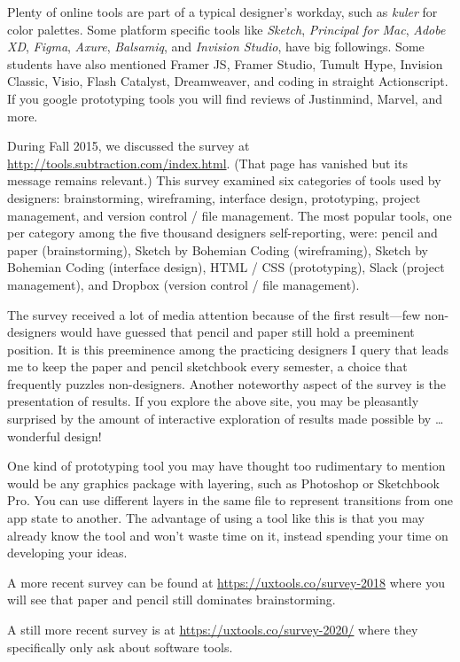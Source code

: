 Plenty of online tools are part of a typical designer's workday, such as
\emph{kuler} for color palettes. Some platform specific tools like
\emph{Sketch}, \emph{Principal for Mac}, \emph{Adobe XD}, \emph{Figma},
\emph{Axure}, \emph{Balsamiq}, and \emph{Invision Studio}, have big
followings. Some students have also mentioned Framer JS, Framer Studio,
Tumult Hype, Invision Classic, Visio, Flash Catalyst, Dreamweaver, and
coding in straight Actionscript. If you google prototyping tools you
will find reviews of Justinmind, Marvel, and more.

During Fall 2015, we discussed the survey at
\url{http://tools.subtraction.com/index.html}. (That page has vanished
but its message remains relevant.) This survey examined six categories
of tools used by designers: brainstorming, wireframing, interface
design, prototyping, project management, and version control / file
management. The most popular tools, one per category among the five
thousand designers self-reporting, were: pencil and paper
(brainstorming), Sketch by Bohemian Coding (wireframing), Sketch by
Bohemian Coding (interface design), HTML / CSS (prototyping), Slack
(project management), and Dropbox (version control / file management).

The survey received a lot of media attention because of the first
result---few non-designers would have guessed that pencil and paper
still hold a preeminent position. It is this preeminence among the
practicing designers I query that leads me to keep the paper and pencil
sketchbook every semester, a choice that frequently puzzles
non-designers. Another noteworthy aspect of the survey is the
presentation of results. If you explore the above site, you may be
pleasantly surprised by the amount of interactive exploration of results
made possible by \ldots{} wonderful design!

One kind of prototyping tool you may have thought too rudimentary to
mention would be any graphics package with layering, such as Photoshop
or Sketchbook Pro. You can use different layers in the same file to
represent transitions from one app state to another. The advantage of
using a tool like this is that you may already know the tool and won't
waste time on it, instead spending your time on developing your ideas.

A more recent survey can be found at
\url{https://uxtools.co/survey-2018} where you will see that paper and
pencil still dominates brainstorming.

A still more recent survey is at \url{https://uxtools.co/survey-2020/}
where they specifically only ask about software tools.


